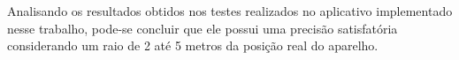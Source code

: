       Analisando os resultados obtidos nos testes realizados no aplicativo implementado nesse
      trabalho, pode-se concluir que ele possui uma precisão satisfatória considerando um raio de 2 
      até 5 metros da posição real do aparelho.

  
